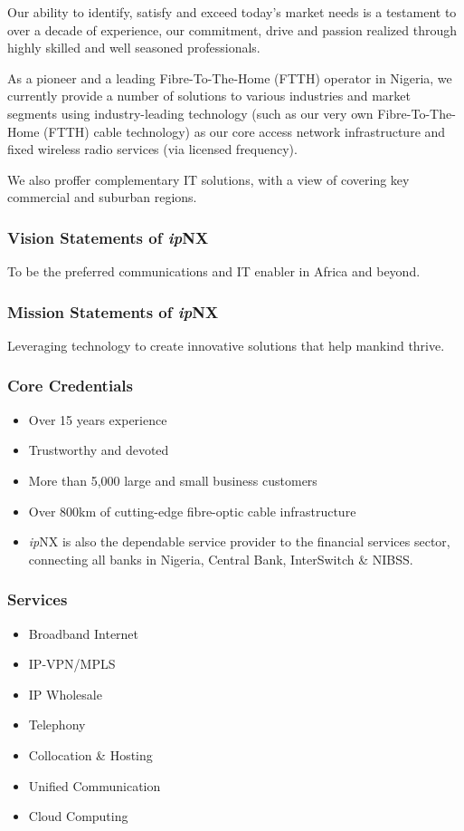 Our ability to identify, satisfy and exceed today’s market needs is a testament to over a decade of experience, our commitment, drive and passion realized through highly skilled and well seasoned professionals.

As a pioneer and a leading Fibre-To-The-Home (FTTH) operator in Nigeria, we currently provide a number of solutions to various industries and market segments using industry-leading technology (such as our very own Fibre-To-The-Home (FTTH) cable technology) as our core access network infrastructure and fixed wireless radio services (via licensed frequency).

We also proffer complementary IT solutions, with a view of covering key commercial and suburban regions.
\subsubsection{Vision Statements of \textit{ip}NX}
To be the preferred communications and IT enabler in Africa and beyond.
\subsubsection{Mission Statements of \textit{ip}NX}
Leveraging technology to create innovative solutions that help mankind thrive.
\subsubsection{Core Credentials}
\begin{itemize}
	\item[] Over 15 years experience
	\item[] Trustworthy and devoted
	\item[] More than 5,000 large and small business customers
	\item[] Over 800km of cutting-edge fibre-optic cable infrastructure
	\item[] \textit{ip}NX is also the dependable service provider to the financial services sector, connecting all banks in Nigeria, Central Bank, InterSwitch \& NIBSS.
\end{itemize}
\subsubsection{Services}
\begin{itemize}
	\item[] Broadband Internet
	\item[] IP-VPN/MPLS
	\item[] IP Wholesale
	\item[] Telephony
	\item[] Collocation \& Hosting
	\item[] Unified Communication
	\item[] Cloud Computing
\end{itemize}
